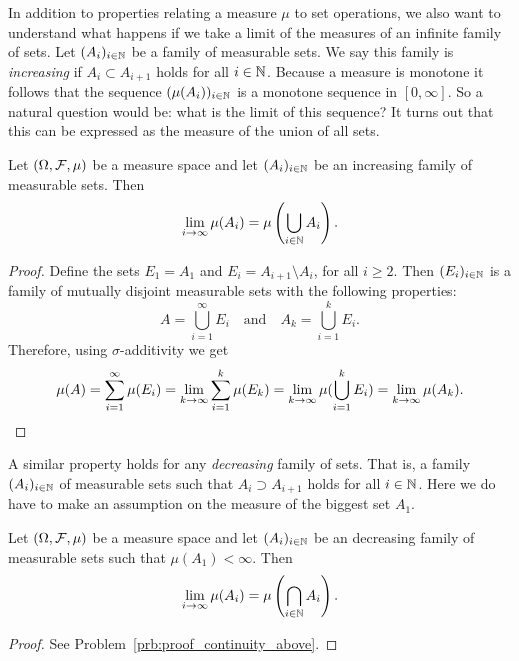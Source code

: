 In addition to properties relating a measure $\mu$ to set operations, we also want to understand what happens if we take a limit of the measures of an infinite family of sets. Let $(A_i)_{i \in \mathbb N}$ be a family of measurable sets. We say this family is \emph{increasing} if $A_i \subset A_{i+1}$ holds for all $i \in \mathbb N$. Because a measure is monotone it follows that the sequence $(\mu(A_i))_{i \in \mathbb N}$ is a monotone sequence in $[0,\infty]$. So a natural question would be: what is the limit of this sequence? It turns out that this can be expressed as the measure of the union of all sets.

\begin{proposition}\label{prop:continuity_measure_below}
Let $(\Omega, \mathcal F, \mu)$ be a measure space and let $(A_i)_{i \in \mathbb N}$ be an increasing family of measurable sets. Then
\[
	\lim_{i \to \infty} \mu(A_i) = \mu\left(\bigcup_{i \in \mathbb N} A_i\right).
\]
\end{proposition}

\begin{proof}
Define the sets $E_1 = A_1$ and $E_i = A_{i+1}\setminus A_i$, for all $i \ge 2$. Then $(E_i)_{i \in \mathbb N}$ is a family of mutually disjoint measurable sets with the following properties:
\[
	A = \bigcup_{i = 1}^\infty E_i \quad \text{and} \quad A_k = \bigcup_{i = 1}^k E_i.
\]
Therefore, using $\sigma$-additivity we get
\[
	\mu(A) = \sum_{i = 1}^\infty \mu(E_i) = \lim_{k \to \infty} \sum_{i = 1}^k \mu(E_k)
	= \lim_{k \to \infty} \mu(\bigcup_{i = 1}^k E_i) = \lim_{k \to \infty} \mu(A_k).\qedhere
\]
\end{proof}

A similar property holds for any \emph{decreasing} family of sets. That is, a family $(A_i)_{i \in \mathbb N}$ of measurable sets such that $A_i \supset A_{i+1}$ holds for all $i \in \mathbb N$. Here we do have to make an assumption on the measure of the biggest set $A_1$.

\begin{proposition}\label{prop:continuity_measure_above}
Let $(\Omega, \mathcal F, \mu)$ be a measure space and let $(A_i)_{i \in \mathbb N}$ be an decreasing family of measurable sets such that $\mu(A_1) < \infty$. Then
\[
	\lim_{i \to \infty} \mu(A_i) = \mu\left(\bigcap_{i \in \mathbb N} A_i\right).
\]
\end{proposition}

\begin{proof}
See Problem~\ref{prb:proof_continuity_above}.
\end{proof}

